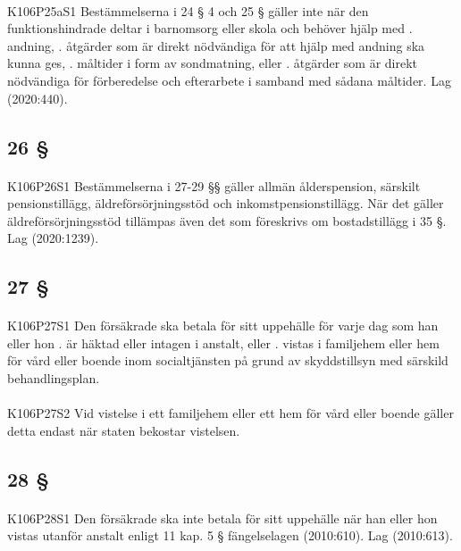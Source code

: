 \documentclass[a4paper,notitlepage,openany,10pt]{book}
\begin{document}
\paragraph*{}
{\tiny K106P25aS1}
Bestämmelserna i 24 § 4 och 25 § gäller inte när den funktionshindrade deltar i barnomsorg eller skola och behöver hjälp med
. andning,
. åtgärder som är direkt nödvändiga för att hjälp med andning ska kunna ges,
. måltider i form av sondmatning, eller
. åtgärder som är direkt nödvändiga för förberedelse och efterarbete i samband med sådana måltider.
Lag (2020:440).
\subsection*{26 §}
\paragraph*{}
{\tiny K106P26S1}
Bestämmelserna i 27-29 §§ gäller allmän ålderspension, särskilt pensionstillägg, äldreförsörjningsstöd och inkomstpensionstillägg. När det gäller äldreförsörjningsstöd tillämpas även det som föreskrivs om bostadstillägg i 35 §.
Lag (2020:1239).
\subsection*{27 §}
\paragraph*{}
{\tiny K106P27S1}
Den försäkrade ska betala för sitt uppehälle för varje dag som han eller hon
. är häktad eller intagen i anstalt, eller
. vistas i familjehem eller hem för vård eller boende inom socialtjänsten på grund av skyddstillsyn med särskild behandlingsplan.
\paragraph*{}
{\tiny K106P27S2}
Vid vistelse i ett familjehem eller ett hem för vård eller boende gäller detta endast när staten bekostar vistelsen.
\subsection*{28 §}
\paragraph*{}
{\tiny K106P28S1}
Den försäkrade ska inte betala för sitt uppehälle när han eller hon vistas utanför anstalt enligt 11 kap. 5 § fängelselagen (2010:610).
Lag (2010:613).
\end{document}

